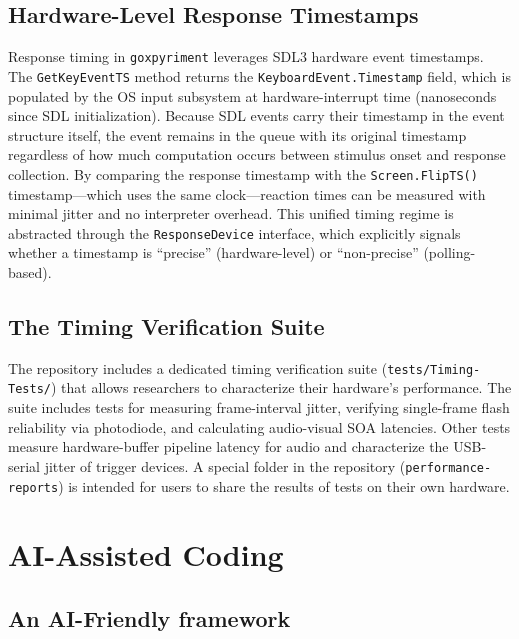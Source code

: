 \documentclass[jou,a4paper]{apa7}
\begin{document}
\subsection{Hardware-Level Response Timestamps}\label{hardware-timestamps}

Response timing in \texttt{goxpyriment} leverages SDL3 hardware event
timestamps. The \texttt{GetKeyEventTS} method returns the
\texttt{KeyboardEvent.Timestamp} field, which is populated by the OS input
subsystem at hardware-interrupt time (nanoseconds since SDL initialization).
Because SDL events carry their timestamp in the event structure itself, the
event remains in the queue with its original timestamp regardless of how
much computation occurs between stimulus onset and response collection.
By comparing the response timestamp with the \texttt{Screen.FlipTS()}
timestamp---which uses the same clock---reaction times can be measured
with minimal jitter and no interpreter overhead. This unified timing
regime is abstracted through the \texttt{ResponseDevice} interface,
which explicitly signals whether a timestamp is ``precise''
(hardware-level) or ``non-precise'' (polling-based).

\subsection{The Timing Verification Suite}\label{timing-verification}

The repository includes a dedicated timing verification suite
(\texttt{tests/Timing-Tests/}) that allows researchers to characterize
their hardware's performance. The suite includes tests for measuring
frame-interval jitter, verifying single-frame flash reliability via
photodiode, and calculating audio-visual SOA latencies. Other tests
measure hardware-buffer pipeline latency for audio and characterize
the USB-serial jitter of trigger devices. A special folder in the
repository (\texttt{performance-reports}) is intended for users to
share the results of tests on their own hardware.


\section{AI-Assisted Coding}\label{ai-assisted}

\subsection{An AI-Friendly framework}\label{ai-friendly-api}
\end{document}
